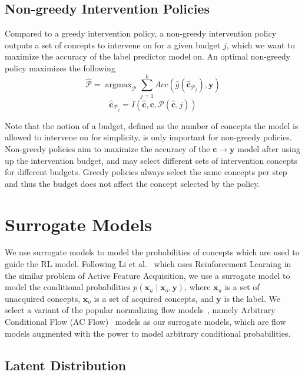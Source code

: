 \documentclass[../main.tex]{subfiles}
\begin{document}
\subsection{Non-greedy Intervention Policies}

Compared to a greedy intervention policy, a non-greedy intervention 
policy outputs a set of concepts to intervene on for a given budget $j$,
which we want to maximize the accuracy of the 
label predictor model on. An optimal non-greedy policy maximizes the following
\[\hat{\mathcal{P}} = \mathop{\mathrm{argmax}}_{\mathcal{P}} \sum_{j=1}^k Acc(\hat{g}(\hat{\mathbf{c}}_{\mathcal{P}_j}), \mathbf{y}) \]
\[\hat{\mathbf{c}}_{\mathcal{P}_j} = I(\hat{\mathbf{c}}, \mathbf{c}, \mathcal{P}(\hat{\mathbf{c}}, j))\]

Note that the notion of a budget, defined as the number
of concepts the model is allowed to intervene on for simplicity, is only
important for non-greedy policies. Non-greedy policies aim
to maximize the accuracy of the $\mathbf{c} \to \mathbf{y}$ model after using up the intervention budget,
and may select different sets of intervention concepts 
for different budgets. Greedy policies always select the same
concepts per step and thus the budget does not 
affect the concept selected by the policy.


\section{Surrogate Models}\label{method:surrogate}

We use surrogate models to model the probabilities of concepts which are used
to guide the RL model. Following Li et al.~\cite{afa} which uses Reinforcement Learning
in the similar problem of Active Feature Acquisition, we use a surrogate model to model
the conditional probabilities $p(\mathbf{x}_u \mid \mathbf{x}_o, \mathbf{y})$, 
where $\mathbf{x}_u$ is a set of unacquired concepts, $\mathbf{x}_o$ is a set of acquired concepts,
and $\mathbf{y}$ is the label. We select a variant of the popular normalizing flow models~\cite{normalizing-flows},
namely Arbitrary Conditional Flow (AC Flow)~\cite{acflow}
models as our surrogate models, 
which are flow models augmented with the power to model arbitrary conditional probabilities.

\subsection{Latent Distribution}
\end{document}
